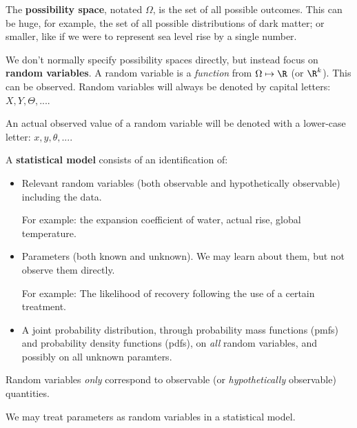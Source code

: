 \documentclass[a4paper]{article}
\begin{document}
            \begin{definition}
                The \textbf{possibility space}, notated $\Omega$, is the set of
                all possible outcomes. This can be huge, for example, the set of
                all possible distributions of dark matter; or smaller, like if
                we were to represent sea level rise by a single number.

                We don't normally specify possibility spaces directly, but
                instead focus on \textbf{random variables}. A random variable is
                a \textit{function} from $\Omega \mapsto \R$ (or $\R^k$). This
                can be observed. Random variables will always be denoted by
                capital letters: $X, Y, \Theta, ...$.

                An actual observed value of a random variable will be denoted
                with a lower-case letter: $x, y, \theta, ...$.

                A \textbf{statistical model} consists of an identification of:

                \begin{itemize}
                    \item Relevant random variables (both observable and
                        hypothetically observable) including the data.

                        For example: the expansion coefficient of water, actual
                        rise, global temperature.

                    \item Parameters (both known and unknown). We may learn
                        about them, but not observe them directly.

                        For example: The likelihood of recovery following the
                        use of a certain treatment.

                    \item A joint probability distribution, through probability
                        mass functions (pmfs) and probability density functions
                        (pdfs), on \textit{all} random variables, and possibly
                        on all unknown paramters.
                \end{itemize}
            \end{definition}

            \begin{warn}
                Random variables \textit{only} correspond to observable (or
                \textit{hypothetically} observable) quantities.

                We may treat parameters as random variables in a statistical
                model.
            \end{warn}
\end{document}
